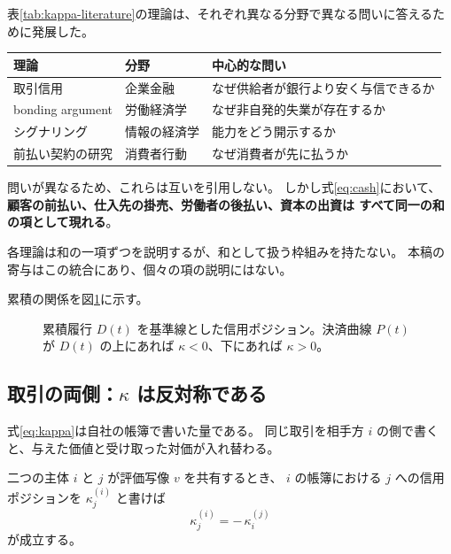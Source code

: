 \begin{remark}[四つの理論は互いを参照しない]
\label{rem:disjoint-literatures}
表\ref{tab:kappa-literature}の理論は、それぞれ異なる分野で異なる問いに答えるために発展した。

\begin{center}
\begin{tabularx}{\textwidth}{@{}llX@{}}
\toprule
理論 & 分野 & 中心的な問い \\
\midrule
取引信用 & 企業金融 & なぜ供給者が銀行より安く与信できるか \\
bonding argument & 労働経済学 & なぜ非自発的失業が存在するか \\
シグナリング & 情報の経済学 & 能力をどう開示するか \\
前払い契約の研究 & 消費者行動 & なぜ消費者が先に払うか \\
\bottomrule
\end{tabularx}
\label{tab:disjoint-theories-questions}
\end{center}

問いが異なるため、これらは互いを引用しない。
しかし式\eqref{eq:cash}において、
\textbf{顧客の前払い、仕入先の掛売、労働者の後払い、資本の出資は
すべて同一の和の項として現れる}。

各理論は和の一項ずつを説明するが、和として扱う枠組みを持たない。
本稿の寄与はこの統合にあり、個々の項の説明にはない。
\end{remark}

累積の関係を図\ref{fig:kappa}に示す。

\begin{figure}[htbp]
\centering
{}
\caption{累積履行 $D(t)$ を基準線とした信用ポジション。決済曲線 $P(t)$ が $D(t)$ の上にあれば $\kappa<0$、下にあれば $\kappa>0$。}
\label{fig:kappa}
\end{figure}

\subsection{取引の両側：$\kappa$ は反対称である}
\label{sec:kappa-antisym}

式\eqref{eq:kappa}は自社の帳簿で書いた量である。
同じ取引を相手方 $i$ の側で書くと、与えた価値と受け取った対価が入れ替わる。

\begin{proposition}[反対称性]
\label{prop:kappa-antisym}
二つの主体 $i$ と $j$ が評価写像 $v$ を共有するとき、
$i$ の帳簿における $j$ への信用ポジションを $\kappa_j^{(i)}$ と書けば
\begin{equation}
\kappa_j^{(i)} = -\,\kappa_i^{(j)}
\label{eq:kappa-antisym}
\end{equation}
が成立する。
\end{proposition}

